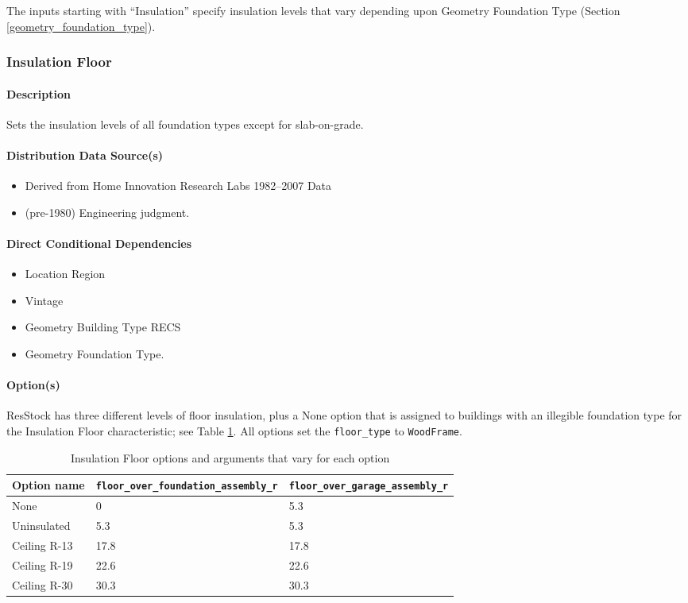 The inputs starting with ``Insulation'' specify insulation levels that vary depending upon Geometry Foundation Type (Section \ref{geometry_foundation_type}). 
\subsubsection{Insulation Floor}\label{insulation_floor}
\paragraph{Description}
Sets the insulation levels of all foundation types except for slab-on-grade. 
\paragraph{Distribution Data Source(s)}
\begin{itemize}
 
\item
  Derived from Home Innovation Research Labs 1982--2007 Data
\item
  (pre-1980) Engineering judgment.
\end{itemize}
\paragraph{Direct Conditional Dependencies}

\begin{itemize}
    \item Location Region
    \item Vintage
    \item Geometry Building Type RECS
    \item Geometry Foundation Type.
\end{itemize}
\paragraph{Option(s)}
ResStock has three different levels of floor insulation, plus a None option that is assigned to buildings with an illegible foundation type for the Insulation Floor characteristic; see Table \ref{table:hc_opt_ins_floor}. All options set the \texttt{floor\_type} to \texttt{WoodFrame}.

\begin{longtable}[]{|p{3.5cm}|p{3cm}|p{3cm}|} \caption{Insulation Floor options and arguments that vary for each option} \label{table:hc_opt_ins_floor} \\  
\toprule\noalign{}
Option name &
\texttt{floor\_over\_foundation\_assembly\_r} &
\texttt{floor\_over\_garage\_assembly\_r}  \\
\midrule\noalign{}
\endhead
\bottomrule\noalign{}
\endlastfoot
None & 0 & 5.3  \\
Uninsulated & 5.3 & 5.3  \\
Ceiling R-13 & 17.8 & 17.8  \\
Ceiling R-19 & 22.6 & 22.6 \\
Ceiling R-30 & 30.3 & 30.3  \\
\end{longtable}


